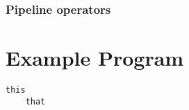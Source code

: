 \documentclass[11pt]{article}
\begin{document}
\subsubsection{Pipeline operators}


\section{Example Program}
\begin{lstlisting}
this
	that
\end{lstlisting}

\end{document}

